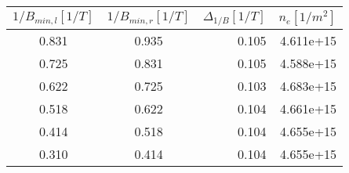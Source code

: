 \begin{tabular}{ccrr}
\toprule
 $1/B_{min, l}[1/\si{T}] $&  $1/B_{min, r}[1/\si{T}] $ & $ \Delta_{1/B}[1/\si{T}]$ &  $n_e [1/\si{m}^2]$\\
\midrule
       0.831 &         0.935 &         0.105 &  4.611e+15 \\
       0.725 &         0.831 &         0.105 &  4.588e+15 \\
       0.622 &         0.725 &         0.103 &  4.683e+15 \\
       0.518 &         0.622 &         0.104 &  4.661e+15 \\
       0.414 &         0.518 &         0.104 &  4.655e+15 \\
       0.310 &         0.414 &         0.104 &  4.655e+15 \\
\bottomrule
\end{tabular}
